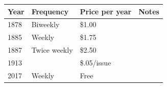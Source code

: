 \documentclass{article}
\begin{document}
\begin{tabular}{llll}
\toprule
Year & Frequency & Price per year & Notes \\
\midrule
1878 & Biweekly & \$1.00 &  \\
1885 & Weekly & \$1.75 &  \\
1887 & Twice weekly & \$2.50 &  \\
1913 &  & \$.05/issue &  \\
2017 & Weekly & Free &  \\
\bottomrule
\end{tabular}
\end{document}
